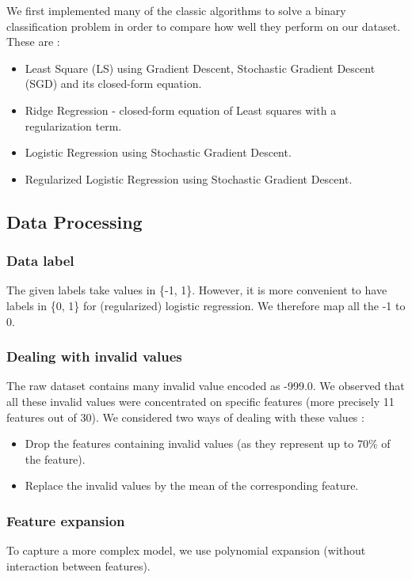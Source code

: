 \documentclass[10pt,conference,compsocconf]{IEEEtran}
\begin{document}
We first implemented many of the classic algorithms to solve a binary classification problem in order to compare how well they perform on our dataset. These are :
\begin{itemize}
    \item Least Square (LS) using Gradient Descent, Stochastic Gradient Descent (SGD) and its closed-form equation.
    \item Ridge Regression - closed-form equation of Least squares with a regularization term.
    \item Logistic Regression using Stochastic Gradient Descent.
    \item Regularized Logistic Regression using Stochastic Gradient Descent.
\end{itemize}

\subsection{Data Processing}

\subsubsection{Data label}
The given labels take values in \{-1, 1\}. However, it is more convenient to have labels in \{0, 1\} for (regularized) logistic regression. We therefore map all the -1 to 0.

\subsubsection{Dealing with invalid values}
The raw dataset contains many invalid value encoded as -999.0. We observed that all these invalid values were concentrated on specific features (more precisely 11 features out of 30). We considered two ways of dealing with these values :
\begin{itemize}
    \item Drop the features containing invalid values (as they represent up to 70\% of the feature).
    \item Replace the invalid values by the mean of the corresponding feature.
\end{itemize}

\subsubsection{Feature expansion}
To capture a more complex model, we use polynomial expansion (without interaction between features).
\end{document}
